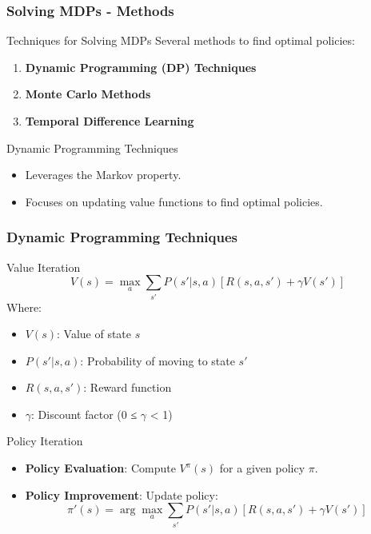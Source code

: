 \documentclass[aspectratio=169]{beamer}
\begin{document}
\begin{frame}[fragile]
  \frametitle{Solving MDPs - Methods}
  \begin{block}{Techniques for Solving MDPs}
    Several methods to find optimal policies:
    \begin{enumerate}
      \item \textbf{Dynamic Programming (DP) Techniques}
      \item \textbf{Monte Carlo Methods}
      \item \textbf{Temporal Difference Learning}
    \end{enumerate}
  \end{block}
  
  \begin{block}{Dynamic Programming Techniques}
    \begin{itemize}
      \item Leverages the Markov property.
      \item Focuses on updating value functions to find optimal policies.
    \end{itemize}
  \end{block}
\end{frame}

\begin{frame}[fragile]
  \frametitle{Dynamic Programming Techniques}
  \begin{block}{Value Iteration}
    \begin{equation}
      V(s) = \max_a \sum_{s'} P(s'|s,a) [R(s,a,s') + \gamma V(s')]
    \end{equation}
    Where:
    \begin{itemize}
      \item \(V(s)\): Value of state \(s\)
      \item \(P(s'|s,a)\): Probability of moving to state \(s'\)
      \item \(R(s,a,s')\): Reward function
      \item \(\gamma\): Discount factor (0 ≤ \(\gamma\) < 1)
    \end{itemize}
  \end{block}

  \begin{block}{Policy Iteration}
    \begin{itemize}
      \item \textbf{Policy Evaluation}: Compute \(V^{\pi}(s)\) for a given policy \(\pi\).
      \item \textbf{Policy Improvement}: Update policy:
      \begin{equation}
        \pi'(s) = \arg\max_a \sum_{s'} P(s'|s,a) [R(s,a,s') + \gamma V(s')]
      \end{equation}
    \end{itemize}
  \end{block}
\end{frame}
\end{document}
